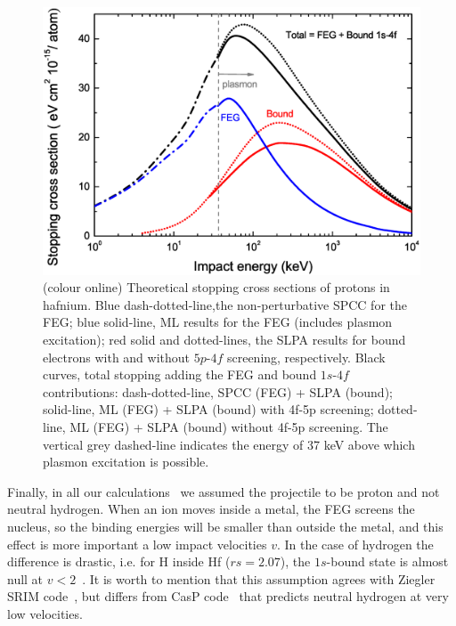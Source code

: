 \documentclass[aps,pra,reprint,superscriptaddress]{revtex4-1}
\begin{document}
\begin{figure}[!t]
\centering
\includegraphics[width=13.cm]{Fig02_new3.eps}
\caption{(colour online) Theoretical stopping cross sections of protons in hafnium. 
Blue dash-dotted-line,the non-perturbative SPCC for the FEG; blue solid-line, 
ML results for the FEG (includes plasmon excitation); red
solid and dotted-lines, the SLPA results for bound electrons with and 
without $5p$-$4f$ screening, respectively. Black curves, total  stopping
adding the FEG and bound $1s$-$4f$ contributions: dash-dotted-line, 
SPCC (FEG) + SLPA (bound); solid-line, ML (FEG) + SLPA (bound) with 
4f-5p screening; dotted-line, ML (FEG) + SLPA (bound) without 4f-5p screening.
The vertical grey dashed-line indicates the energy of 37 keV above which plasmon 
excitation is possible.} 
\label{slpa4f}
\end{figure}


Finally, in all our calculations~\cite{mon17} we assumed the projectile 
to be proton and not neutral hydrogen. When an ion moves inside a metal,
 the FEG screens the nucleus, so the binding energies will be smaller 
than outside the metal, and this effect is more important a low impact 
velocities $v$. In the case of hydrogen the difference is drastic, i.e. 
for H inside Hf ($rs=2.07$), the $1s$-bound state is almost null at 
$v<2$~\cite{suppression}. It is worth to mention that this assumption 
agrees with Ziegler SRIM code~\cite{Ziegler01}, but differs from CasP 
code~\cite{Grande} that predicts neutral hydrogen at very low velocities.
\end{document}
